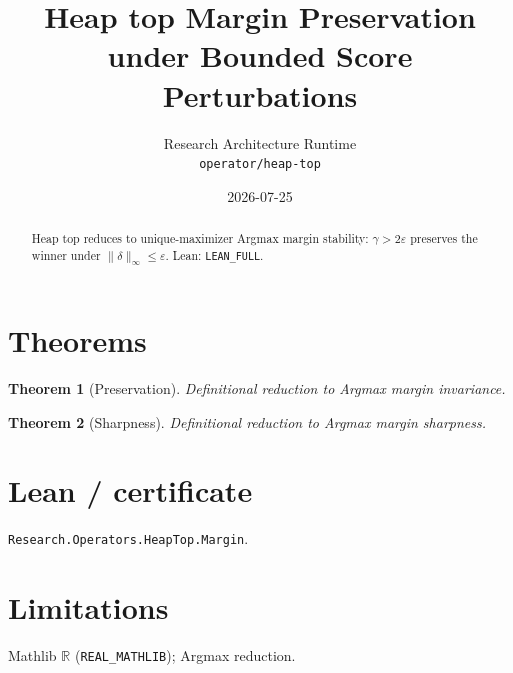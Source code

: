 \documentclass[11pt]{article}
\title{Heap top Margin Preservation under Bounded Score Perturbations}
\author{Research Architecture Runtime \\ \texttt{operator/heap-top}}
\date{2026-07-25}
\newtheorem{theorem}{Theorem}
\begin{document}
\maketitle
\begin{abstract}
Heap top reduces to unique-maximizer Argmax margin stability: $\gamma>2\varepsilon$
preserves the winner under $\|\delta\|_\infty\le\varepsilon$. Lean: \texttt{LEAN\_FULL}.
\end{abstract}
\section{Theorems}
\begin{theorem}[Preservation]
Definitional reduction to Argmax margin invariance.
\end{theorem}
\begin{theorem}[Sharpness]
Definitional reduction to Argmax margin sharpness.
\end{theorem}
\section{Lean / certificate}
\texttt{Research.Operators.HeapTop.Margin}.
\section{Limitations}
Mathlib $\mathbb{R}$ (\texttt{REAL\_MATHLIB}); Argmax reduction.
\end{document}
